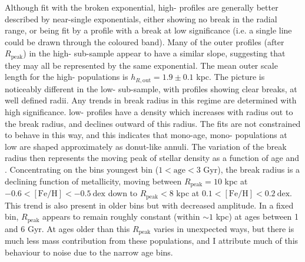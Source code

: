 Although fit with the broken exponential, high-\afe{} profiles are generally better described by near-single exponentials, either showing no break in the radial range, or being fit by a profile with a break at low significance (i.e. a single line could be drawn through the coloured band). Many of the outer profiles (after $R_{\mathrm{peak}}$) in the high-\afe{} sub-sample appear to have a similar slope, suggesting that they may all be represented by the same exponential. The mean outer scale length for the high-\afe{} populations is $h_{R,\text{out}} = 1.9\pm 0.1$ kpc. The picture is noticeably different in the low-\afe{} sub-sample, with profiles showing clear breaks, at well defined radii. Any trends in break radius in this regime are determined with high significance. low-\afe{} profiles have a density which increases with radius out to the break radius, and declines outward of this radius. The fits are not constrained to behave in this way, and this indicates that mono-age, mono-\feh{} populations at low \feh{} are shaped approximately as donut-like annuli. The variation of the break radius then represents the moving peak of stellar density as a function of age and \feh{}. Concentrating on the bins youngest bin ($1 < \mathrm{age} < 3$ Gyr), the break radius is a declining function of metallicity, moving between $R_{\mathrm{peak}}=10$ kpc at $-0.6 < \mathrm{[Fe/H]} < -0.5\ \mathrm{dex}$ down to $R_{\mathrm{peak}} < 8$ kpc at $0.1 < \mathrm{[Fe/H]} < 0.2\ \mathrm{dex}$. This trend is also present in older bins but with decreased amplitude. In a fixed \feh{} bin, $R_{\mathrm{peak}}$ appears to remain roughly constant (within $\sim1$ kpc) at ages between 1 and 6 Gyr.  At ages older than this $R_{\mathrm{peak}}$ varies in unexpected ways, but there is much less mass contribution from these populations, and I attribute much of this behaviour to noise due to the narrow age bins. 


